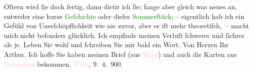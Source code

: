                   Oſtern wird ſie doch fertig, dann dictir ich ſie; fange aber gleich
               was neues an, entweder eine kurze \textcolor{green}{Geſchichte}{} oder dieſes \textcolor{green}{Sommerſtück}{}; – eigentlich hab ich ein Gefühl von
                  Unerſchöpf{\pb}lichkeit wie nie zuvor, aber es iſt mehr
               theoretiſch, – macht mich nicht beſonders glücklich. Ich empfinde meinen Verluſt
               ſchwerer und ſichrer als je.\pend
           \pstart
           Leben Sie wohl und ſchreiben Sie mir bald ein Wort.\pend
           \pstart Von Herzen Ihr \spacefill\mbox{Arthur.}\pend{}\pstart
           \noindent{}Ich hoffe Sie haben meinen Brief \introOben{}(aus \textcolor{pink}{Wien}{}\ledrightnote{\textcolor{pink}{Wien}})\introOben{} und auch die Karten aus \textcolor{pink}{Dalmatien}{}\ledrightnote{\textcolor{pink}{Dalmatien}} bekommen.\pend
           \pstart
           \textcolor{pink}{Wien}{}\ledrightnote{\textcolor{pink}{Wien}}, 9. 4. 900.\pend
           \endnumbering{}  
      